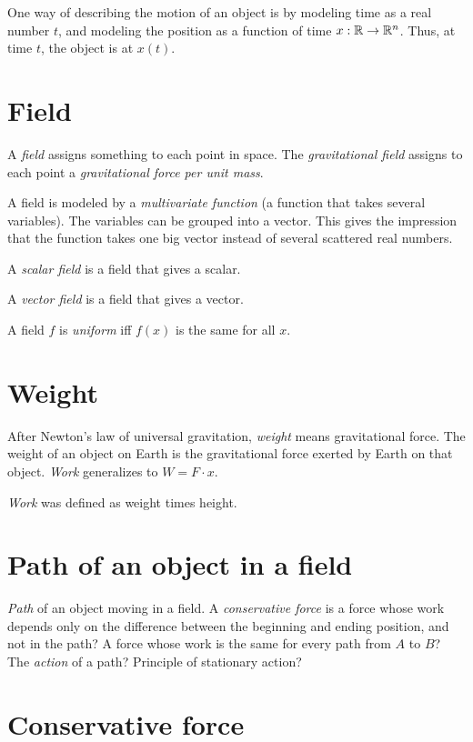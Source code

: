 One way of describing the motion of an object is by modeling time as a real number \( t \),
and modeling the position as a function of time \( x : \mathbb{R} \to \mathbb{R}^n \).
Thus, at time \( t \), the object is at \( x(t) \).

\section{Field}

A \emph{field} assigns something to each point in space.
The \emph{gravitational field} assigns to each point a \emph{gravitational force per unit mass}.

A field is modeled by a \emph{multivariate function} (a function that takes several variables).
The variables can be grouped into a vector.
This gives the impression that the function takes one big vector instead of several scattered real numbers.

A \emph{scalar field} is a field that gives a scalar.

A \emph{vector field} is a field that gives a vector.

A field \(f\) is \emph{uniform} iff \(f(x)\) is the same for all \(x\).

\section{Weight}

After Newton's law of universal gravitation,
\emph{weight} means gravitational force.
The weight of an object on Earth is the gravitational force exerted by Earth on that object.
\emph{Work} generalizes to \( W = F \cdot x \).

\emph{Work} was defined as weight times height.

\section{Path of an object in a field}

\emph{Path} of an object moving in a field.
A \emph{conservative force} is a force whose work depends only on the difference between the beginning and ending position,
and not in the path?
A force whose work is the same for every path from \(A\) to \(B\)?
The \emph{action} of a path?
Principle of stationary action?

\section{Conservative force}

